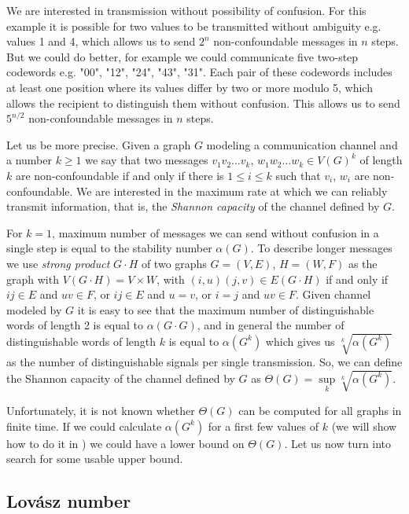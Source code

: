 We are interested in transmission without possibility of confusion. For this example it is possible for two values to be transmitted without ambiguity e.g. values 1 and 4, which allows us to send $2^n$ non-confoundable messages in $n$ steps. But we could do better, for example we could communicate five two-step codewords e.g. "00", "12", "24", "43", "31". Each pair of these codewords includes at least one position where its values differ by two or more modulo 5, which allows the recipient to distinguish them without confusion.  This allows us to send $5^{n / 2}$ non-confoundable messages in $n$ steps.

Let us be more precise. Given a graph $G$ modeling a communication channel and a number $k \geq 1$ we say that two messages $v_1v_2\ldots v_k$, $w_1w_2\ldots w_k \in V(G)^k$ of length $k$ are non-confoundable if and only if there is $1 \leq i \leq k$ such that $v_i$, $w_i$ are non-confoundable. We are interested in the maximum rate at which we can reliably transmit information, that is, the \emph{Shannon capacity} of the channel defined by $G$.

For $k = 1$, maximum number of messages we can send without confusion in a single step is equal to the stability number $\alpha(G)$. To describe longer messages we use \emph{strong product} $G \cdot H$ of two graphs $G = (V, E)$, $H = (W, F)$ as the graph with $V(G \cdot H) = V \times W$, with $(i, u)(j, v) \in E(G \cdot H)$ if and only if $ij \in E$ and $uv \in F$, or $ij \in E$ and $u = v$, or $i = j$ and $uv \in F$. Given channel modeled by $G$ it is easy to see that the maximum number of distinguishable words of length 2 is equal to $\alpha(G \cdot G)$, and in general the number of distinguishable words of length $k$ is equal to $\alpha(G^k)$ which gives us $\sqrt[k]{\alpha(G^k)}$ as the number of distinguishable signals per single transmission. So, we can define the Shannon capacity of the channel defined by $G$ as $\Theta(G) = \sup\limits_k \sqrt[k]{\alpha(G^k)}$.

Unfortunately, it is not known whether $\Theta(G)$ can be computed for all graphs in finite time. If we could calculate $\alpha(G^k)$ for a first few values of $k$ (we will show how to do it in ) we could have a lower bound on $\Theta(G)$. Let us now turn into search for some usable upper bound.

\subsection{Lovász number}

